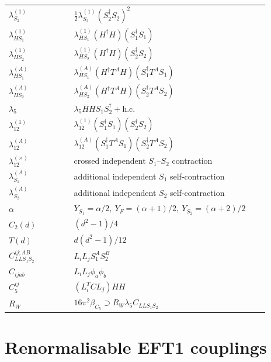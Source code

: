 \documentclass[8pt]{article}
\begin{document}
\begin{landscape}
\begin{longtable}{@{}p{0.23\linewidth}p{0.69\linewidth}@{}}
$\lambda_{S_2}^{(1)}$ & $\frac12\lambda_{S_2}^{(1)}(S_2^\dagger S_2)^2$ \\
$\lambda_{HS_1}^{(1)}$ & $\lambda_{HS_1}^{(1)}(H^\dagger H)(S_1^\dagger S_1)$ \\
$\lambda_{HS_2}^{(1)}$ & $\lambda_{HS_2}^{(1)}(H^\dagger H)(S_2^\dagger S_2)$ \\
$\lambda_{HS_1}^{(A)}$ & $\lambda_{HS_1}^{(A)}(H^\dagger T^AH)(S_1^\dagger T^AS_1)$ \\
$\lambda_{HS_2}^{(A)}$ & $\lambda_{HS_2}^{(A)}(H^\dagger T^AH)(S_2^\dagger T^AS_2)$ \\
$\lambda_5$ & $\lambda_5HHS_1S_2^\dagger+\mathrm{h.c.}$ \\
$\lambda_{12}^{(1)}$ & $\lambda_{12}^{(1)}(S_1^\dagger S_1)(S_2^\dagger S_2)$ \\
$\lambda_{12}^{(A)}$ & $\lambda_{12}^{(A)}(S_1^\dagger T^AS_1)(S_2^\dagger T^AS_2)$ \\
$\lambda_{12}^{(\times)}$ & crossed independent $S_1$--$S_2$ contraction \\
$\lambda_{S_1}^{(A)}$ & additional independent $S_1$ self-contraction \\
$\lambda_{S_2}^{(A)}$ & additional independent $S_2$ self-contraction \\
$\alpha$ & $Y_{S_1}=\alpha/2,\ Y_F=(\alpha+1)/2,\ Y_{S_2}=(\alpha+2)/2$ \\
$C_2(d)$ & $(d^2-1)/4$ \\
$T(d)$ & $d(d^2-1)/12$ \\
$C_{LLS_1S_2}^{ij;AB}$ & $L_iL_jS_1^AS_2^B$ \\
$C_{ijab}$ & $L_iL_j\phi_a\phi_b$ \\
$C_5^{ij}$ & $(L_i^TCL_j)HH$ \\
$R_W$ & $16\pi^2\beta_{C_5}\supset R_W\lambda_5C_{LLS_1S_2}$ \\
\bottomrule
\end{longtable}
\section*{Renormalisable EFT1 couplings}

\end{landscape}
\end{document}
